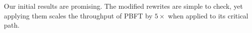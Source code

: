 


Our initial results are promising.
The modified rewrites are simple to check, yet applying them scales the throughput of PBFT by $5\times$ when applied to its critical path.



